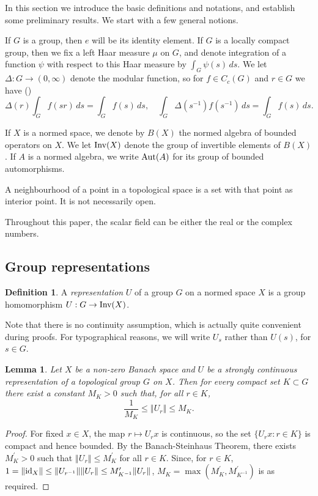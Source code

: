 \documentclass{amsart}
\theoremstyle{plain}
\newtheorem{lemma}[theorem]{Lemma}
\theoremstyle{definition}
\newtheorem{defn}[theorem]{Definition}
\numberwithin{equation}{section}
\begin{document}
In this section we introduce the basic definitions and notations, and establish some preliminary results. We start with a few general notions.

If $G$ is a group, then $e$ will be its identity element. If $G$ is a locally compact group, then we fix a left Haar measure $\mu$ on $G$, and denote integration of a function $\psi$ with respect to this Haar measure by $\int_G \psi(s) {\,ds}$. We let $\Delta: G \to (0,\infty)$ denote the modular function, so for $f \in C_c(G)$ and $r \in G$ we have (\cite[Lemma~1.61,~Lemma~1.67]{williams})
\[ \Delta(r) \int_G f(sr) {\,ds} = \int_G f(s) {\,ds}, \quad \int_G \Delta(s^{-1}) f(s^{-1}) {\,ds} = \int_G f(s) {\,ds}. \]

If $X$ is a normed space, we denote by $B(X)$ the normed algebra of bounded operators on $X$. We let ${\textup{Inv}}(X)$ denote the group of invertible elements of $B(X)$. If $A$ is a normed algebra, we write ${\textup{Aut}}(A)$ for its group of bounded automorphisms.

A neighbourhood of a point in a topological space is a set with that point as interior point. It is not necessarily open.

Throughout this paper, the scalar field can be either the real or the complex numbers.

\subsection{Group representations}\label{subsec:group_representations}

\begin{defn}
A \emph{representation} $U$ of a group $G$ on a normed space $X$ is a group homomorphism $U: G \to {\textup{Inv}}(X)$.
\end{defn}

Note that there is no continuity assumption, which is actually quite convenient during proofs. For typographical reasons, we will write $U_s$ rather than $U(s)$, for $s\in G$.

\begin{lemma}\label{l:str_cont_compactly_bounded}
 Let $X$ be a non-zero Banach space and $U$ be a strongly continuous representation of a topological group $G$ on $X$. Then for every compact set $K \subset G$ there exist a constant $M_K > 0$ such that, for all $r \in K$,
\[ \frac{1}{M_K} \leq {\left\Vert {U_r} \right\Vert} \leq M_K.\]
\end{lemma}

\begin{proof}
 For fixed $x \in X$, the map $r \mapsto U_r x$ is continuous, so the set $\{U_r x: r \in K\}$ is compact and hence bounded. By the Banach-Steinhaus Theorem, there exists $M_K^\prime>0$ such that ${\left\Vert {U_r} \right\Vert} \leq M_K^\prime$ for all $r\in K$. Since, for $r\in K$, $1={\left\Vert {{\textup{id}}_X} \right\Vert}\leq {\left\Vert {U_{r^{-1}}} \right\Vert}{\left\Vert {U_r} \right\Vert}\leq M_{K^{-1}}^\prime {\left\Vert {U_r} \right\Vert}$, $M_K=\max (M_K^\prime, M_{K^{-1}}^\prime)$ is as required.
\end{proof}
\end{document}
